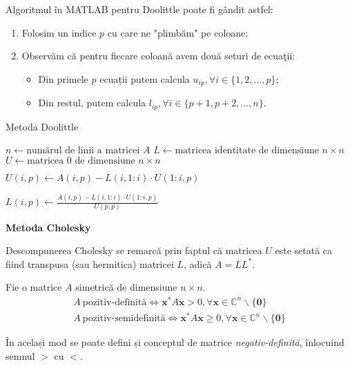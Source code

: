 \documentclass{exam}
\newcommand{\octavescript}[2]{
	
}
\begin{document}
Algoritmul în MATLAB pentru Doolittle poate fi gândit astfel:
\begin{enumerate}
	\item Folosim un indice $p$ cu care ne "plimbăm" pe coloane;
	\item Observăm că pentru fiecare coloană avem două seturi de ecuaţii:
	      \begin{itemize}
		      \item Din primele $p$ ecuații putem calcula $u_{ip}, \forall i \in \{1, 2, \ldots, p \}$;
		      \item Din restul, putem calcula $l_{ip}, \forall i \in \{p + 1, p + 2, \ldots, n\}$.
	      \end{itemize}
\end{enumerate}

\newpage

\begin{algorithm}
	\caption{Metoda Doolittle}
	\begin{algorithmic}[1]
		\State \( n \gets \text{numărul de linii a matricei } A \)
		\State \( L \gets \text{matricea identitate de dimensiune } n \times n \)
		\State \( U \gets \text{matricea 0 de dimensiune } n \times n \)

		\State \( U(i, p) \gets A(i, p) - L(i, 1:i) \cdot U(1:i, p) \)
		\EndFor

		\State \( L(i, p) \gets \frac{A(i, p) - L(i, 1:i) \cdot U(1:i, p)}{U(p, p)} \)
		\EndFor
		\EndFor
	\end{algorithmic}
\end{algorithm}

\textbf{Metoda Cholesky}

\par Descompunerea Cholesky se remarcă prin faptul că matricea $U$ este setată
ca fiind transpusa (sau hermitica) matricei $L$, adică $A = LL^*$.

Fie o matrice $A$ simetrică de dimensiune $n \times n$.
\begin{gather*}
	A \ \text{pozitiv-definită} \Leftrightarrow \mathbf{x}^* A \mathbf{x} > 0, \forall \mathbf{x} \in \mathbb{C}^n \backslash \{\mathbf{0}\} \\
	A \ \text{pozitiv-semidefinită} \Leftrightarrow \mathbf{x}^* A \mathbf{x} \geq 0, \forall \mathbf{x} \in \mathbb{C}^n \backslash \{\mathbf{0}\}
\end{gather*}

În același mod se poate defini și conceptul de matrice
\textit{negativ-definită}, înlocuind semnul $>$ cu $<$.
\end{document}
